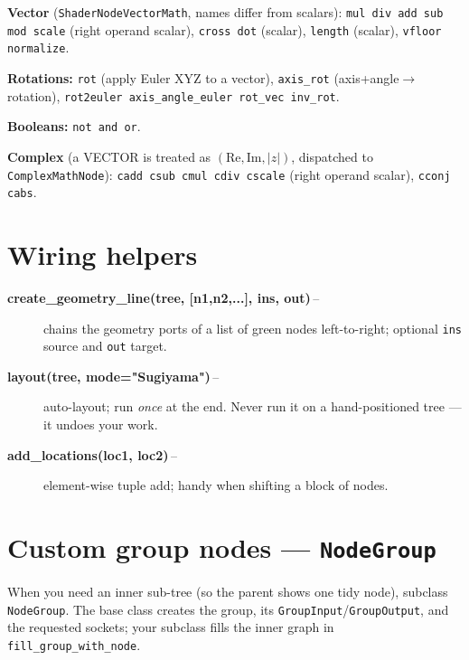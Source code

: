 \documentclass[10pt,a4paper,twocolumn]{article}
\newcommand{\code}[1]{\texttt{\small #1}}
\newcommand{\cls}[3]{\item[\textbf{#1}\,#2] #3}
\begin{document}
\smallskip
\textbf{Vector} (\code{ShaderNodeVectorMath}, names differ from scalars):
\code{mul div add sub mod scale} (right operand scalar),
\code{cross dot} (scalar), \code{length} (scalar), \code{vfloor
normalize}.

\smallskip
\textbf{Rotations:} \code{rot} (apply Euler XYZ to a vector), \code{axis\_rot}
(axis+angle$\rightarrow$rotation), \code{rot2euler axis\_angle\_euler
rot\_vec inv\_rot}.

\smallskip
\textbf{Booleans:} \code{not and or}.

\smallskip
\textbf{Complex} (a VECTOR is treated as $(\mathrm{Re},\mathrm{Im},|z|)$,
dispatched to \code{ComplexMathNode}): \code{cadd csub cmul cdiv cscale}
(right operand scalar), \code{cconj cabs}.

\section{Wiring helpers}

\begin{description}
\cls{create\_geometry\_line(tree, [n1,n2,...], ins, out)}{--}{chains the
  geometry ports of a list of green nodes left-to-right; optional
  \code{ins} source and \code{out} target.}
\cls{layout(tree, mode="Sugiyama")}{--}{auto-layout; run \emph{once} at
  the end. Never run it on a hand-positioned tree --- it undoes your
  work.}
\cls{add\_locations(loc1, loc2)}{--}{element-wise tuple add; handy when
  shifting a block of nodes.}
\end{description}

\section{Custom group nodes --- \texttt{NodeGroup}}
\label{sec:custom}

When you need an inner sub-tree (so the parent shows one tidy node),
subclass \code{NodeGroup}. The base class creates the group, its
\code{GroupInput}/\code{GroupOutput}, and the requested sockets; your
subclass fills the inner graph in \code{fill\_group\_with\_node}.
\end{document}
